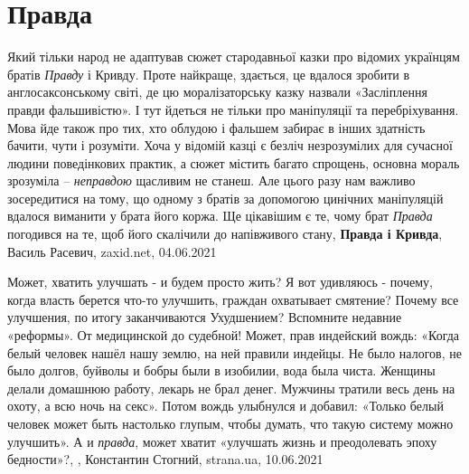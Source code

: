  
 
 
 
 
\chapter{Правда}
\label{sec:slova.pravda}

Який тільки народ не адаптував сюжет стародавньої казки про відомих українцям
братів \emph{Правду} і Кривду. Проте найкраще, здається, це вдалося зробити в
англосаксонському світі, де цю моралізаторську казку назвали «Засліплення
правди фальшивістю». І тут йдеться не тільки про маніпуляції та перебріхування.
Мова йде також про тих, хто облудою і фальшем забирає в інших здатність бачити,
чути і розуміти. Хоча у відомій казці є безліч незрозумілих для сучасної людини
поведінкових практик, а сюжет містить багато спрощень, основна мораль зрозуміла
– \emph{неправдою} щасливим не станеш. Але цього разу нам важливо зосередитися на
тому, що одному з братів за допомогою цинічних маніпуляцій вдалося виманити у
брата його коржа. Ще цікавішим є те, чому брат \emph{Правда} погодився на те, щоб його
скалічили до напівживого стану,
\textbf{Правда і Кривда}, Василь Расевич, zaxid.net, 04.06.2021

Может, хватить улучшать - и будем просто жить?  Я вот удивляюсь - почему, когда
власть берется что-то улучшить, граждан охватывает смятение? Почему все
улучшения, по итогу заканчиваются Ухудшением? Вспомните недавние «реформы». От
медицинской до судебной!  Может, прав индейский вождь: «Когда белый человек
нашёл нашу землю, на ней правили индейцы. Не было налогов, не было долгов,
буйволы и бобры были в изобилии, вода была чиста. Женщины делали домашнюю
работу, лекарь не брал денег. Мужчины тратили весь день на охоту, а всю ночь на
секс». Потом вождь улыбнулся и добавил: «Только белый человек может быть
настолько глупым, чтобы думать, что такую систему можно улучшить».  А и
\emph{правда}, может хватит «улучшать жизнь и преодолевать эпоху бедности»?,
, Константин Стогний, strana.ua, 10.06.2021

